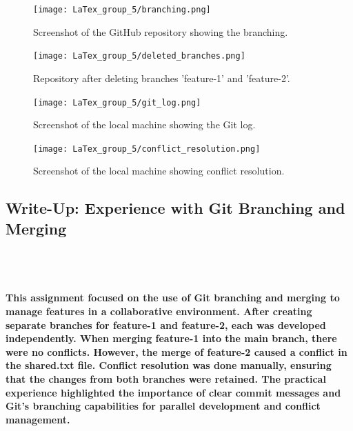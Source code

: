 \documentclass[12pt, a4paper]{article}
\begin{document}
\begin{figure}[h!]
    \centering
    \texttt{[image: LaTex\_group\_5/branching.png]} %
     \hspace{4 cm}
    \caption{Screenshot of the GitHub repository showing the branching.}
\end{figure}
\newpage
{}
\vspace{-1.5cm}

\begin{figure}[h!]
    \centering
    \texttt{[image: LaTex\_group\_5/deleted\_branches.png]}
       \hspace{4 cm}
    \caption{Repository after deleting branches 'feature-1' and 'feature-2'.}
    \label{fig:enter-label}
\end{figure}
\hspace{6 cm}
\begin{figure}[h!]
    \centering
    \texttt{[image: LaTex\_group\_5/git\_log.png]} %
    \hspace{4 cm}
    \caption{Screenshot of the local machine showing the Git log.}
\end{figure}
\hspace{6 cm}
\begin{figure}[h!]
    \centering
    \texttt{[image: LaTex\_group\_5/conflict\_resolution.png]} %
       \hspace{4 cm}
    \caption{Screenshot of the local machine showing conflict resolution.}
\end{figure}
\newpage
{}
\vspace{-1.5cm}
\subsection*{\Huge{Write-Up: Experience with Git Branching and Merging}}
\\\
\paragraph {This assignment focused on the use of Git branching and merging to manage features in a collaborative environment. After creating separate branches for feature-1 and feature-2, each was developed independently.
When merging feature-1 into the main branch, there were no conflicts. However, the merge of feature-2 caused a conflict in the shared.txt file. Conflict resolution was done manually, ensuring that the changes from both branches were retained.
The practical experience highlighted the importance of clear commit messages and Git’s branching capabilities for parallel development and conflict management.}
\end{document}
